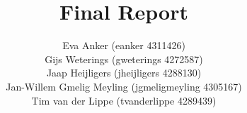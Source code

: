 \documentclass{tudelft-report}
\begin{document}
\frontmatter
	
\title[For MoodCat]{Final Report}
\author{\small Eva Anker (eanker 4311426)\\
		Gijs Weterings (gweterings 4272587)\\
		Jaap Heijligers (jheijligers 4288130)\\
		Jan-Willem Gmelig Meyling (jgmeligmeyling 4305167)\\
		Tim van der Lippe (tvanderlippe 4289439)}
\makecover



\tableofcontents

%


\mainmatter









\appendix




\printglossary

\end{document}
